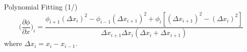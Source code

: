 
\begin{frame}{Polynomial Fitting (1/)}
\[\bigg( \frac{\partial \phi}{\partial x} \bigg)_{i} = \frac{\phi_{i+1}(\Delta x_{i})^{2} - \phi_{i-1}(\Delta x_{i+1})^{2} + \phi_{i}[(\Delta x_{i+1})^{2} - (\Delta x_{i})^{2}]}{\Delta x_{i+1}\Delta x_{i} (\Delta x_{i}+\Delta x_{i+1})} \]
where $\Delta x_{i} = x_{i} - x_{i-1}$.
\end{frame}